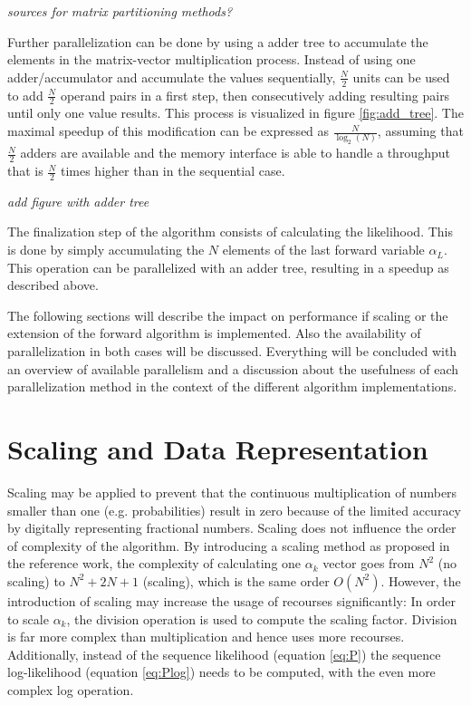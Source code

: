 \documentclass[mscthesis]{usiinfthesis}
\begin{document}
\emph{\color{red}sources for matrix partitioning methods?}

Further parallelization can be done by using a adder tree to accumulate the
elements in the matrix-vector multiplication process. Instead of using one
adder/accumulator and accumulate the values sequentially, $ \frac{N}{2} $ units
can be used to add $ \frac{N}{2} $ operand pairs in a first step, then
consecutively adding resulting pairs until only one value results. This process
is visualized in figure \ref{fig:add_tree}. The maximal speedup of this
modification can be expressed as $ \frac{N}{\log_2(N)} $, assuming that
$ \frac{N}{2} $ adders are available and the memory interface is able to handle
a throughput that is $ \frac{N}{2} $ times higher than in the sequential case.

\emph{\color{red}add figure with adder tree}

The finalization step of the algorithm consists of calculating the likelihood.
This is done by simply accumulating the $N$ elements of the last forward
variable $\alpha_L$. This operation can be parallelized with an adder tree,
resulting in a speedup as described above.

The following sections will describe the impact on performance if scaling or
the extension of the forward algorithm is implemented. Also the availability of
parallelization in both cases will be discussed. Everything will be concluded
with an overview of available parallelism and a discussion about the usefulness
of each parallelization method in the context of the different algorithm
implementations.

\section{Scaling and Data Representation}
\label{ch:analysis_scaling}

Scaling may be applied to prevent that the continuous multiplication of numbers
smaller than one (e.g. probabilities) result in zero because of the limited
accuracy by digitally representing fractional numbers. Scaling does not
influence the order of complexity of the algorithm. By introducing a scaling
method as proposed in the reference work, the complexity of calculating one
$ \alpha_k $ vector goes from $ N^2 $ (no scaling) to $ N^2 + 2N
+ 1 $ (scaling), which is the same order $ O(N^2) $.  However, the introduction
of scaling may increase the usage of recourses significantly: In order to scale
$ \alpha_k $, the division operation is used to compute the scaling factor.
Division is far more complex than multiplication and hence uses more recourses.
Additionally, instead of the sequence likelihood (equation \ref{eq:P}) the
sequence log-likelihood (equation \ref{eq:Plog}) needs to be computed, with the
even more complex log operation.
\end{document}
